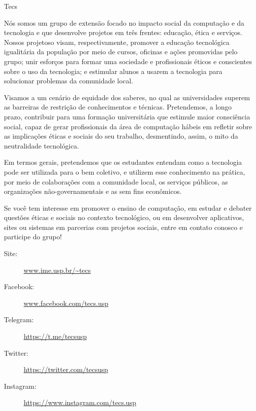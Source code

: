 
\begin{subsecao}{Tecs}


Nós somos um grupo de extensão focado no impacto social da computação e da 
tecnologia e que desenvolve projetos em três frentes: educação, ética e 
serviços. Nossos projetoso visam, respectivamente, promover a educação tecnológica 
igualitária da população por meio de cursos, oficinas e ações promovidas pelo 
grupo; unir esforços para formar uma sociedade e profissionais éticos e
conscientes sobre o uso da tecnologia; e estimular alunos a usarem a tecnologia 
para solucionar problemas da comunidade local.

Visamos a um cenário de equidade dos saberes, no qual as universidades superem
as barreiras de restrição de conhecimentos e técnicas. Pretendemos, a longo prazo,
contribuir para uma formação universitária que estimule maior consciência social, 
capaz de gerar profissionais da área de computação hábeis em refletir sobre as 
implicações éticas e sociais do seu trabalho, desmentindo, assim, o mito da 
neutralidade tecnológica.

Em termos gerais, pretendemos que os estudantes entendam como a tecnologia pode
ser utilizada para o bem coletivo, e utilizem esse conhecimento na prática, por
meio de colaborações com a comunidade local, os serviços públicos, as
organizações não-governamentais e as sem fins econômicos. 

Se você tem interesse em promover o ensino de computação, em estudar e debater 
questões éticas e sociais no contexto tecnológico, ou em desenvolver aplicativos,
sites ou sistemas em parcerias com projetos sociais, entre em contato conosco e 
participe do grupo!

\vspace{-1em}
\begin{description}
  \item[Site:] \url{www.ime.usp.br/~tecs}
  \item[Facebook:] \url{www.facebook.com/tecs.usp}
  \item[Telegram:] \url{https://t.me/tecsusp}
  \item[Twitter:] \url{https://twitter.com/tecsusp}
  \item[Instagram:] \url{https://www.instagram.com/tecs.usp} 
\end{description}

\end{subsecao}

